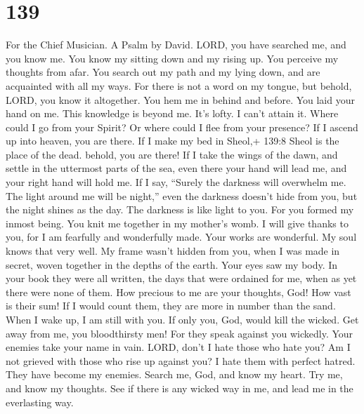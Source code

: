 \hypertarget{section-129}{%
\section{139}\label{section-129}}

For the Chief Musician. A Psalm by David.  LORD, you have
searched me, and you know me.  You know my sitting down and
my rising up. You perceive my thoughts from afar.  You
search out my path and my lying down, and are acquainted with all my
ways.  For there is not a word on my tongue, but behold,
LORD, you know it altogether.  You hem me in behind and
before. You laid your hand on me.  This knowledge is beyond
me. It's lofty. I can't attain it.  Where could I go from
your Spirit? Or where could I flee from your presence?  If I
ascend up into heaven, you are there. If I make my bed in Sheol,+ 139:8
Sheol is the place of the dead. behold, you are there!  If I
take the wings of the dawn, and settle in the uttermost parts of the
sea,  even there your hand will lead me, and your right
hand will hold me.  If I say, ``Surely the darkness will
overwhelm me. The light around me will be night,''  even
the darkness doesn't hide from you, but the night shines as the day. The
darkness is like light to you.  For you formed my inmost
being. You knit me together in my mother's womb.  I will
give thanks to you, for I am fearfully and wonderfully made. Your works
are wonderful. My soul knows that very well.  My frame
wasn't hidden from you, when I was made in secret, woven together in the
depths of the earth.  Your eyes saw my body. In your book
they were all written, the days that were ordained for me, when as yet
there were none of them.  How precious to me are your
thoughts, God! How vast is their sum!  If I would count
them, they are more in number than the sand. When I wake up, I am still
with you.  If only you, God, would kill the wicked. Get
away from me, you bloodthirsty men!  For they speak against
you wickedly. Your enemies take your name in vain.  LORD,
don't I hate those who hate you? Am I not grieved with those who rise up
against you?  I hate them with perfect hatred. They have
become my enemies.  Search me, God, and know my heart. Try
me, and know my thoughts.  See if there is any wicked way
in me, and lead me in the everlasting way.

